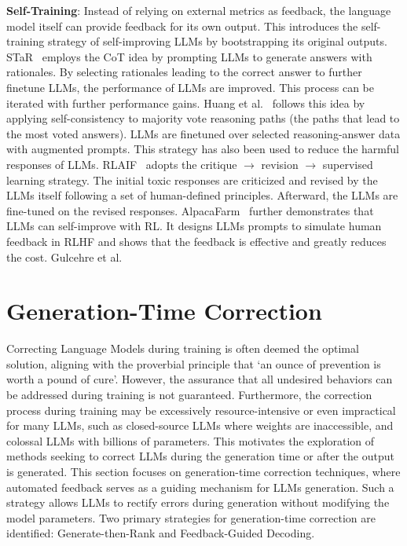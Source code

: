\documentclass[a4paper,oneside]{book}
\begin{document}
\textbf{Self-Training}: Instead of relying on external metrics as feedback, the language model itself can provide feedback for its own output. This introduces the self-training strategy of self-improving LLMs by bootstrapping its original outputs. STaR~\cite{zelikman2022star} employs the CoT idea by prompting LLMs to generate answers with rationales. By selecting rationales leading to the correct answer to further finetune LLMs, the performance of LLMs are improved. This process can be iterated with further performance gains. Huang et al.~\cite{huang2022large} follows this idea by applying self-consistency to majority vote reasoning paths (the paths that lead to the most voted answers). LLMs are finetuned over selected reasoning-answer data with augmented prompts. This strategy has also been used to reduce the harmful responses of LLMs. RLAIF~\cite{bai2022training} adopts the critique $\rightarrow$ revision $\rightarrow$ supervised learning strategy. The initial toxic responses are criticized and revised by the LLMs itself following a set of human-defined principles. Afterward, the LLMs are fine-tuned on the revised responses. AlpacaFarm~\cite{dubois2024alpacafarm} further demonstrates that LLMs can self-improve with RL. It designs LLMs prompts to simulate human feedback in RLHF and shows that the feedback is effective and greatly reduces the cost. Gulcehre et al.

\section{Generation-Time Correction}
Correcting Language Models during training is often deemed the optimal solution, aligning with the proverbial principle that `an ounce of prevention is worth a pound of cure'. However, the assurance that all undesired behaviors can be addressed during training is not guaranteed. Furthermore, the correction process during training may be excessively resource-intensive or even impractical for many LLMs, such as closed-source LLMs where weights are inaccessible, and colossal LLMs with billions of parameters. This motivates the exploration of methods seeking to correct LLMs during the generation time or after the output is generated. This section focuses on generation-time correction techniques, where automated feedback serves as a guiding mechanism for LLMs generation. Such a strategy allows LLMs to rectify errors during generation without modifying the model parameters. Two primary strategies for generation-time correction are identified: Generate-then-Rank and Feedback-Guided Decoding.
\end{document}
